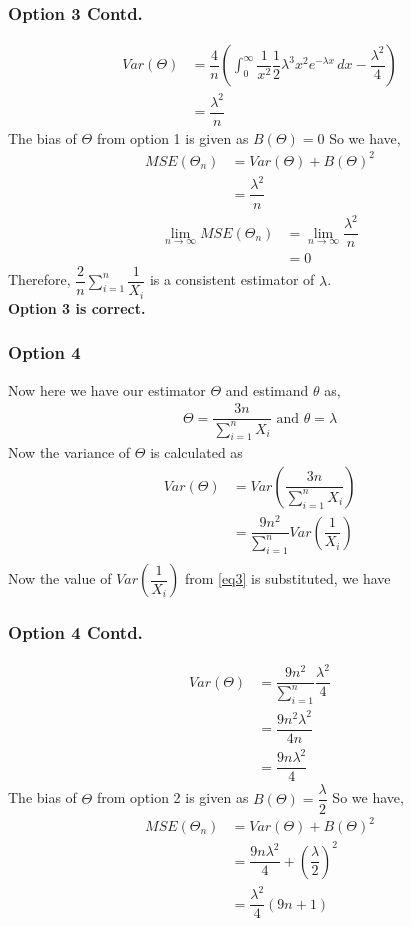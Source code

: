 \documentclass{beamer}
\providecommand{\brak}[1]{\ensuremath{\left(#1\right)}}
\begin{document}
\begin{frame}
 \frametitle{Option 3 Contd.}
\begin{align}
     Var(\Theta)  & =  \dfrac{4}{n} \brak{ \int_{0}^{\infty} \dfrac{1}{x^2}  \dfrac{1}{2} \lambda^3x^2e^{-\lambda x} \,dx  - {\dfrac{\lambda^2}{4}} } \\
    &= \dfrac{\lambda^2}{n}
\end{align}
The bias of $ \Theta $ from option 1 is given as $B(\Theta) = 0$
So we have,
\begin{align}
    MSE(\Theta_n) &= Var(\Theta) + B(\Theta)^2 \\
    &= \dfrac{\lambda^2}{n}
\end{align}
\begin{align}
     \lim_{n\to\infty} MSE( \Theta_n) &=    \lim_{n\to\infty} \dfrac{\lambda^2}{n} \\
      &= 0
\end{align}
Therefore, $\dfrac{2}{n} \sum_{i=1}^{n} \dfrac{1}{X_i} $ is a consistent estimator of $ \lambda$. \\
\textbf{Option 3 is correct.}
\end{frame}
 
 \begin{frame}
 \frametitle{Option 4}
Now here we have our estimator $ \Theta$ and estimand $ \theta $ as,
 \begin{align}
     \Theta = \dfrac{3n}{\sum_{i=1}^{n} X_i } \text{  and  }
     \theta = \lambda
 \end{align}
Now the variance of $ \Theta$ is calculated as
\begin{align}
    Var(\Theta) &= Var\brak{\dfrac{3n}{\sum_{i=1}^{n} X_i } } \\
    & = \dfrac{9n^2}{ \sum_{i=1}^{n}} Var\brak{\dfrac{1}{X_i}} \\
\end{align}
Now the value of $ Var\brak{\dfrac{1}{X_i}} $ from \eqref{eq3} is substituted, we have
 \end{frame}

 \begin{frame}
 \frametitle{Option 4 Contd.}
\begin{align}
     Var(\Theta) &= \dfrac{9n^2}{ \sum_{i=1}^{n}} \dfrac{\lambda^2}{4} \\
     & = \dfrac{9n^2 \lambda^2}{4n } \\
     & = \dfrac{9n \lambda^2}{4 }
\end{align}
The bias of $ \Theta $ from option 2 is given as $ B(\Theta) = \dfrac{\lambda}{2} $
So we have,
\begin{align}
    MSE(\Theta_n) &= Var(\Theta) + B(\Theta)^2 \\
    &= \dfrac{9n \lambda^2}{4 } + \brak{\dfrac{\lambda}{2}}^2 \\
    & = \dfrac{ \lambda^2}{4 } (9n+1)
\end{align}
 \end{frame}
\end{document}
